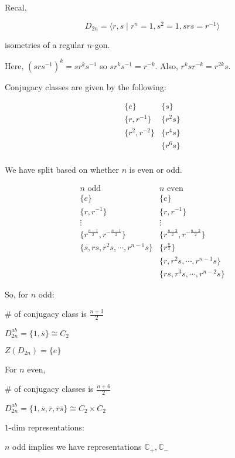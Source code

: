 \documentclass{article}
\theoremstyle{definition}
\begin{document}
Recal,

\[
    D_{2n} = \langle r,s \mid r^n = 1, s^2 = 1, s r s = r ^{-1} \rangle 
\]

isometries of a regular \(n\)-gon.

Here, \((srs ^{-1})^k = s r^k s ^{-1}\) so \(s r^k s ^{-1} = r^{-k}\). Also, \(r^k s r^{-k} = r^{2k} s\).

Conjugacy classes are given by the following:

\[
    \begin{array}{cc}
        \{ e \} &  \{ s \} \\
        \{ r, r ^{-1} \} &  \{ r^2 s \} \\
        \{ r^2, r^{-2} \}  &  \{ r^4 s \}  \\
                            & \{ r^6 s \} \\
    \end{array}
\]

We have split based on whether \(n\) is even or odd.

\[
    \begin{array}{cc}
        n \text{ odd} &  n \text{ even}  \\
        \{ e \}  &  \{ e \} \\
        \{ r, r ^{-1} \}  & \{ r, r ^{-1} \} \\
        \vdots &  \vdots \\
        \{ r^{\frac{n-1}{2}}, r^{-\frac{n-1}{2}} \}  & \{ r^{\frac{n-2}{2}}, r^{-\frac{n-2}{2}}\}  \\
        \{ s, rs, r^2 s, \cdots , r^{n-1}s \}  & \{ r^{\frac{n}{2}} \}  \\
        & \{ r, r^2 s, \cdots , r^{n-1} s \} \\
        & \{ rs, r^3 s, \cdots , r^{n-2}s \}  
    \end{array}
\]

So, for \(n\) odd:

\(\#\) of conjugacy class is \(\frac{n+3}{2}\)

\(D_{2n}^{ab} = \{ 1, \overline{s} \} \cong C_2 \)

\(Z(D_{2n}) = \{ e \} \) 

For \(n\) even,

\(\#\) of conjugacy classes is \(\frac{n+6}{2}\) 

\(D_{2n}^{ab} = \{ 1, \overline{s}, \overline{r}, \overline{r} \overline{s} \} \cong C_2 \times C_2\) 

\(1\)-dim representations:

\(n\) odd implies we have representations \(\mathbb{C}_+,\mathbb{C}_-\)
\end{document}
